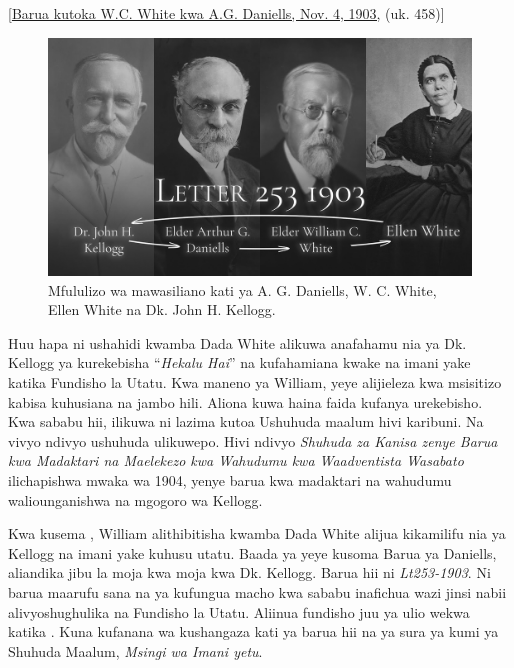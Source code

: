 [\href{https://ellenwhite.org/letterbooks/555}{Barua kutoka W.C. White kwa A.G. Daniells, Nov. 4, 1903,} (uk. 458)]

\begin{figure}[h]
    \centering
    \includegraphics[width=1\linewidth]{images/correspondance.jpg}
    \caption*{Mfululizo wa mawasiliano kati ya A. G. Daniells, W. C. White, Ellen White na Dk. John H. Kellogg.}
    \label{fig:corespondance}
\end{figure}

Huu hapa ni ushahidi kwamba Dada White alikuwa anafahamu nia ya Dk. Kellogg ya kurekebisha “\textit{Hekalu Hai}” na kufahamiana kwake na imani yake katika Fundisho la Utatu. Kwa maneno ya William, yeye alijieleza kwa msisitizo kabisa kuhusiana na jambo hili. Aliona kuwa haina faida kufanya urekebisho. Kwa sababu hii, ilikuwa ni lazima kutoa Ushuhuda maalum hivi karibuni. Na vivyo ndivyo ushuhuda ulikuwepo. Hivi ndivyo \textit{Shuhuda za Kanisa zenye Barua kwa Madaktari na Maelekezo kwa Wahudumu kwa Waadventista Wasabato} ilichapishwa mwaka wa 1904, yenye barua kwa madaktari na wahudumu waliounganishwa na mgogoro wa Kellogg.

Kwa kusema , William alithibitisha kwamba Dada White alijua kikamilifu nia ya Kellogg na imani yake kuhusu utatu. Baada ya yeye kusoma Barua ya Daniells, aliandika jibu la moja kwa moja kwa Dk. Kellogg. Barua hii ni \textit{Lt253-1903}. Ni barua maarufu sana na ya kufungua macho kwa sababu inafichua wazi jinsi nabii alivyoshughulika na Fundisho la Utatu. Aliinua fundisho juu ya  ulio wekwa katika . Kuna kufanana wa kushangaza kati ya barua hii na ya sura ya kumi ya Shuhuda Maalum, \textit{Msingi wa Imani yetu}.



